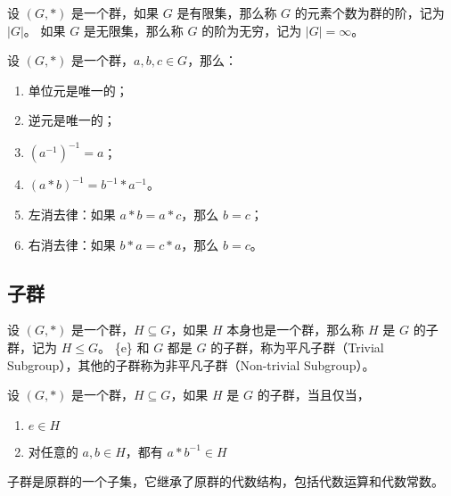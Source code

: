 \begin{definition}[群的阶]
    设 $(G, *)$ 是一个群，如果 $G$ 是有限集，那么称 $G$ 的元素个数为群的阶，记为 $|G|$。
    如果 $G$ 是无限集，那么称 $G$ 的阶为无穷，记为 $|G| = \infty$。
\end{definition}

\vspace{1em}

\begin{proposition}[群运算的性质]
    设 $(G, *)$ 是一个群，$a, b, c\in G$，那么：
    \begin{enumerate}
        \item 单位元是唯一的；
        \item 逆元是唯一的；
        \item $(a^{-1})^{-1} = a$；
        \item $(a * b)^{-1} = b^{-1} * a^{-1}$。
        \item 左消去律：如果 $a * b = a * c$，那么 $b = c$；
        \item 右消去律：如果 $b * a = c * a$，那么 $b = c$。
    \end{enumerate}
\end{proposition}
\vspace{1em}

\subsection{子群}
\begin{definition}[子群 Subgroup]
    设 $(G, *)$ 是一个群，$H\subseteq G$，如果 $H$ 本身也是一个群，那么称 $H$ 是 $G$ 的子群，记为 $H \le G$。
    \{e\} 和 $G$ 都是 $G$ 的子群，称为平凡子群（Trivial Subgroup），其他的子群称为非平凡子群（Non-trivial Subgroup）。
    \label{def:subgroup}
\end{definition}

\begin{theorem}[子群判定定理]
    设 $(G, *)$ 是一个群，$H\subseteq G$，如果 $H$ 是 $G$ 的子群，当且仅当，
    \begin{enumerate}
        \item $e \in H$
        \item 对任意的 $a, b \in H$，都有 $a * b^{-1} \in H$
    \end{enumerate}
\end{theorem}
\begin{note}
    子群是原群的一个子集，它继承了原群的代数结构，包括代数运算和代数常数。
\end{note}
\vspace{1em}

